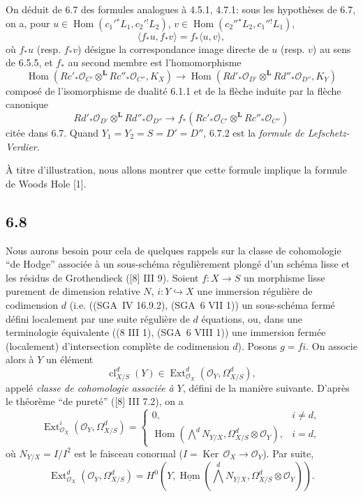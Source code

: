 \documentclass[11pt]{article}
\providecommand{\cO}{\mathcal{O}}
\DeclareMathOperator{\Hom}{Hom}
\DeclareMathOperator{\Ext}{Ext}
\providecommand{\Ker}{\operatorname{Ker}}
\providecommand{\cl}{\operatorname{cl}}
\providecommand{\Hom}{\operatorname{Hom}}
\providecommand{\Ker}{\operatorname{Ker}}
\providecommand{\Ker}{\operatorname{Ker}}
\providecommand{\cl}{\operatorname{cl}}
\providecommand{\Hom}{\operatorname{Hom}}
\providecommand{\cl}{\operatorname{cl}}
\begin{document}
On déduit de 6.7 des formules analogues à 4.5.1, 4.7.1: sous les hypothèses de 6.7, on a, pour $u\in\Hom(c_1'{}^*L_1,c_2'{}^!L_2)$, $v\in\Hom(c_2''{}^*L_2,c_1''{}^!L_1)$,
\begin{equation}
\tag{6.7.2}
\langle f_*u,f_*v\rangle=f_*\langle u,v\rangle,
\end{equation}
où $f_*u$ (resp. $f_*v$) désigne la correspondance image directe de $u$ (resp. $v$) au sens de 6.5.5, et $f_*$ au second membre est l'homomorphisme
\begin{equation}
\tag{6.7.3}
\Hom(Rc'_*\cO_{C'}\otimes^{\mathbf L}Rc''_*\cO_{C''},K_X)
\longrightarrow
\Hom(Rd'_*\cO_{D'}\otimes^{\mathbf L}Rd''_*\cO_{D''},K_Y)
\end{equation}
composé de l'isomorphisme de dualité 6.1.1 et de la flèche induite par la flèche canonique
\[
Rd'_*\cO_{D'}\otimes^{\mathbf L}Rd''_*\cO_{D''}\longrightarrow f_*(Rc'_*\cO_{C'}\otimes^{\mathbf L}Rc''_*\cO_{C''})
\]
citée dans 6.7. Quand $Y_1=Y_2=S=D'=D''$, 6.7.2 est la \emph{formule de Lefschetz-Verdier}.

À titre d'illustration, nous allons montrer que cette formule implique la formule de Woods Hole [1].

\subsection*{6.8}
Nous aurons besoin pour cela de quelques rappels sur la classe de cohomologie ``de Hodge'' associée à un sous-schéma régulièrement plongé d'un schéma lisse et les résidus de Grothendieck ([8] III 9). Soient $f:X\to S$ un morphisme lisse purement de dimension relative $N$, $i:Y\hookrightarrow X$ une immersion régulière de codimension $d$ (i.e. ((SGA~IV 16.9.2), (SGA~6 VII 1)) un sous-schéma fermé défini localement par une suite régulière de $d$ équations, ou, dans une terminologie équivalente ((8 III 1), (SGA~6 VIII 1)) une immersion fermée (localement) d'intersection complète de codimension $d$). Posons $g=fi$. On associe alors à $Y$ un élément
\begin{equation}
\tag{6.8.1}
\cl^d_{X/S}(Y)\in\Ext^d_{\cO_X}(\cO_Y,\Omega^d_{X/S}),
\end{equation}
appelé \emph{classe de cohomologie associée à $Y$}, défini de la manière suivante. D'après le théorème ``de pureté'' ([8] III 7.2), on a
\begin{equation}
\tag{6.8.2}
\Ext^i_{\cO_X}(\cO_Y,\Omega^d_{X/S})=
\begin{cases}
0,& i\ne d,\\
\Hom(\bigwedge^d N_{Y/X},\Omega^d_{X/S}\otimes\cO_Y),& i=d,
\end{cases}
\end{equation}
où $N_{Y/X}=I/I^2$ est le faisceau conormal ($I=\Ker\,\cO_X\to\cO_Y$). Par suite,
\begin{equation}
\tag{6.8.3}
\Ext^d_{\cO_X}(\cO_Y,\Omega^d_{X/S})=H^0(Y,\underline{\Hom}(\bigwedge^dN_{Y/X},\Omega^d_{X/S}\otimes\cO_Y)).
\end{equation}
\end{document}
